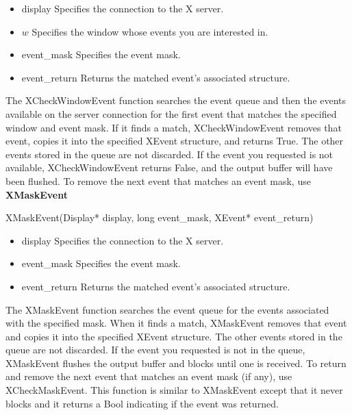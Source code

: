\documentclass{report}
\begin{document}
\begin{itemize}
\begin{cppcode}
            \end{cppcode}
            \bigbreak \noindent
            \begin{itemize}
                \item display Specifies the connection to the X server.
                \item $w$ Specifies the window whose events you are interested in.
                \item event\_mask Specifies the event mask.
                \item event\_return Returns the matched event’s associated structure.
            \end{itemize}
            The XCheckWindowEvent function searches the event queue and then the events available on the server connection for the first event that matches the specified window and event mask. If it finds a match, XCheckWindowEvent removes that event, copies it into the specified XEvent structure, and returns True. The other events stored in the queue are not discarded. If the event you requested is not available, XCheckWindowEvent returns False, and the output buffer will have been flushed.
            \bigbreak \noindent 
            To remove the next event that matches an event mask, use \textbf{XMaskEvent}
            \bigbreak \noindent 
            \begin{cppcode}
            XMaskEvent(Display* display, long event_mask, XEvent* event_return)
            \end{cppcode}
            \bigbreak \noindent
            \begin{itemize}
                \item display Specifies the connection to the X server.
                \item event_mask Specifies the event mask.
                \item event_return Returns the matched event’s associated structure.
            \end{itemize}
            The XMaskEvent function searches the event queue for the events associated with the specified mask. When it finds a match, XMaskEvent removes that event and copies it into the specified XEvent structure. The other events stored in the queue are not discarded. If the event you requested is not in the queue, XMaskEvent flushes the output buffer and blocks until one is received.
            \bigbreak \noindent 
            To return and remove the next event that matches an event mask (if any), use XCheckMaskEvent. This function is similar to XMaskEvent except that it never blocks and it returns a Bool indicating if the event was returned.

\end{itemize}
\end{document}
